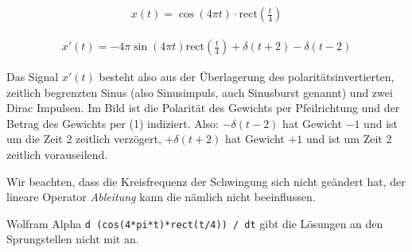 \begin{Loesung}

\begin{align}
x(t) = \cos(4\pi t) \cdot \mathrm{rect}(\frac{t}{4})
\end{align}

\begin{align}x'(t)=
- 4\pi\sin(4\pi t) \mathrm{rect}(\frac{t}{4})
+ \delta(t+2)
- \delta(t-2)
\end{align}

\begin{center}
\end{center}

Das Signal $x'(t)$ besteht also aus der Überlagerung des polaritätsinvertierten,
zeitlich begrenzten Sinus (also Sinusimpuls, auch
Sinusburst genannt) und zwei Dirac Impulsen.
Im Bild ist die
Polarität des Gewichts per Pfeilrichtung und der Betrag des Gewichts per (1)
indiziert. Also: $-\delta(t-2)$ hat Gewicht $-1$ und ist um die Zeit 2 zeitlich
verzögert,
$+\delta(t+2)$ hat Gewicht $+1$ und ist um Zeit 2 zeitlich vorauseilend.

Wir beachten, dass die Kreisfrequenz der Schwingung sich nicht geändert hat, der lineare Operator \textit{Ableitung} kann die nämlich nicht beeinflussen.

Wolfram Alpha \texttt{d (cos(4*pi*t)*rect(t/4)) / dt} gibt die Lösungen an den Sprungstellen nicht mit an.

\end{Loesung}

\newpage
